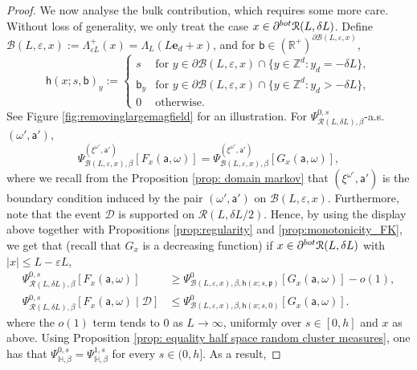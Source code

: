 \documentclass[11pt,a4paper]{article}
\theoremstyle{definition}
\numberwithin{equation}{section}
\begin{document}
\begin{proof}
We now analyse the bulk contribution, which requires some more care. Without loss of generality, we only treat the case $x\in \partial^{\rm bot}\mathcal{R}(L,\delta L)$. 
Define $\mathcal{B}(L,\varepsilon,x):=\Lambda^+_{\varepsilon L}(x)=\Lambda_L(L\mathbf{e}_d+x)$, and for $\mathsf{b}\in (\mathbb{R}^+)^{\partial \mathcal{B}(L,\varepsilon,x)}$,
\begin{equation}
\mathsf{h}(x;s,\mathsf{b})_y:=
\begin{cases}
s & \text{for } y\in \partial \mathcal{B}(L,\varepsilon,x)\cap \{y\in \mathbb Z^d: y_d=-\delta L\},\\
\mathsf{b}_y & \text{for } y\in \partial \mathcal{B}(L,\varepsilon,x)\cap \{y\in \mathbb Z^d: y_d>-\delta L\},\\
0 & \text{otherwise.}
\end{cases}    
\end{equation} 
See Figure \ref{fig:removinglargemagfield} for an illustration. For $\Psi^{0,s}_{\mathcal R(L,\delta L), \beta}$-a.s. $(\omega', \mathsf a')$, 
\begin{equation}
\Psi^{(\xi^{\omega'},\mathsf a')}_{\mathcal B(L, \varepsilon, x), \beta}[F_x(\mathsf a, \omega)] = \Psi^{(\xi^{\omega'},\mathsf a')}_{\mathcal B(L, \varepsilon, x), \beta}[G_x(\mathsf a, \omega)],
\end{equation}
where we recall from the Proposition \ref{prop: domain markov} that $(\xi^{\omega'},\mathsf a')$ is the boundary condition induced by the pair $(\omega',\mathsf a')$ on $\mathcal B(L,\varepsilon, x)$. Furthermore, note that the event $\mathcal{D}$ is supported on $\mathcal{R}(L,\delta L/2)$.
Hence, by using the display above together with Propositions \ref{prop:regularity} and \ref{prop:monotonicity_FK}, we get that (recall that $G_x$ is a decreasing function) if $x\in \partial^{\rm bot}\mathcal{R}(L,\delta L)$ with $|x|\leq L-\varepsilon L$,
\begin{align}\label{eq: psi lower bound}
\Psi^{0,s}_{\mathcal R(L,\delta L),\beta}\left[F_x(\mathsf{a},\omega) \right]&\geq \Psi^{0}_{\mathcal{B}(L,\varepsilon,x),\beta,\mathsf{h}(x;s,\mathfrak{p})}\left[G_x(\mathsf{a},\omega)\right]-o(1),
\\ \label{eq: psi upper bound}
\Psi^{0,s}_{\mathcal R(L,\delta L),\beta}\left[F_x(\mathsf{a},\omega)\mid  \mathcal{D}\right]
&\leq  \Psi^{0}_{\mathcal{B}(L,\varepsilon,x),\beta,\mathsf{h}(x;s,0)}\left[G_x(\mathsf{a},\omega)\right].
\end{align}
where the $o(1)$ term tends to $0$ as $L\to\infty$, uniformly over $s\in [0,h]$ and $x$ as above. Using Proposition \ref{prop: equality half space random cluster measures}, one has that $\Psi^{0,s}_{\mathbb H,\beta}=\Psi^{1,s}_{\mathbb H,\beta}$ for every $s\in (0,h]$. As a result, 

\end{proof}
\end{document}
